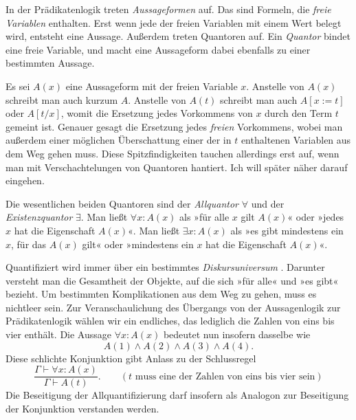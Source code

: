 In der Prädikatenlogik treten \emph{Aussageformen}
auf. Das sind Formeln, die \emph{freie Variablen}
enthalten. Erst wenn jede der freien Variablen mit einem Wert belegt
wird, entsteht eine Aussage. Außerdem treten Quantoren auf. Ein
\emph{Quantor} bindet eine freie Variable, und macht
eine Aussageform dabei ebenfalls zu einer bestimmten Aussage.


Es sei $A(x)$ eine Aussageform mit der freien Variable $x$. Anstelle
von $A(x)$ schreibt man auch kurzum $A$. Anstelle von $A(t)$ schreibt
man auch $A[x:=t]$ oder $A[t/x]$, womit die Ersetzung jedes Vorkommens
von $x$ durch den Term $t$ gemeint ist. Genauer gesagt die Ersetzung
jedes \emph{freien} Vorkommens, wobei man außerdem einer möglichen
Überschattung einer der in $t$ enthaltenen Variablen aus dem Weg gehen
muss. Diese Spitzfindigkeiten tauchen allerdings erst auf, wenn man mit
Verschachtelungen von Quantoren hantiert. Ich will später
näher darauf eingehen.

Die wesentlichen beiden Quantoren sind der \emph{Allquantor}%
 $\forall$ und der
\emph{Existenzquantor} $\exists$. Man ließt
$\forall x\colon A(x)$ als »für alle $x$ gilt $A(x)$« oder »jedes $x$
hat die Eigenschaft $A(x)$«. Man ließt $\exists x\colon A(x)$ als »es
gibt mindestens ein $x$, für das $A(x)$ gilt« oder »mindestens ein $x$
hat die Eigenschaft $A(x)$«.

Quantifiziert wird immer über ein bestimmtes \emph{Diskursuniversum}%
.
Darunter versteht man die Gesamtheit der
Objekte, auf die sich »für alle« und »es gibt« bezieht. Um bestimmten
Komplikationen aus dem Weg zu gehen, muss es nichtleer sein. Zur
Veranschaulichung des Übergangs von der Aussagenlogik zur Prädikatenlogik
wählen wir ein endliches, das lediglich die Zahlen von eins bis vier
enthält. Die Aussage $\forall x\colon A(x)$ bedeutet nun insofern
dasselbe wie
\[A(1)\land A(2)\land A(3)\land A(4).\]
Diese schlichte Konjunktion gibt Anlass zu der Schlussregel
\[\dfrac{\Gamma\vdash\forall x\colon A(x)}{\Gamma\vdash A(t)}.
\qquad(\text{$t$ muss eine der Zahlen von eins bis vier sein})\]
Die Beseitigung der Allquantifizierung darf insofern als Analogon zur
Beseitigung der Konjunktion verstanden werden.

